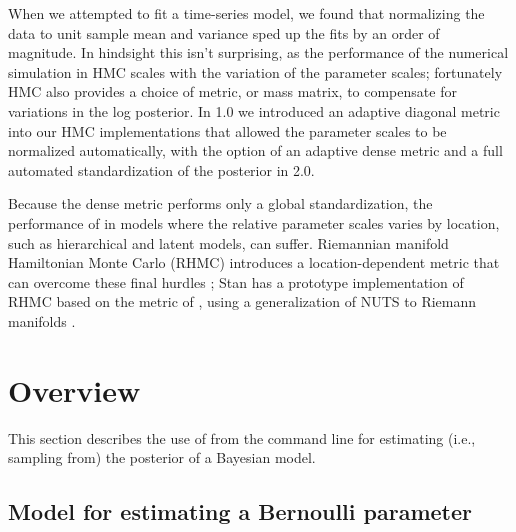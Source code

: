 \documentclass[article]{jss}
\begin{document}
When we attempted to fit a time-series model, we found that
normalizing the data to unit sample mean and variance sped up the fits
by an order of magnitude.  In hindsight this isn't surprising, as the
performance of the numerical simulation in HMC scales with the
variation of the parameter scales; fortunately HMC also provides a
choice of metric, or mass matrix, to compensate for variations in the
log posterior.  In  1.0 we introduced an adaptive
diagonal metric into our HMC implementations that allowed the
parameter scales to be normalized automatically, with the option of an
adaptive dense metric and a full automated standardization of the
posterior in  2.0.

Because the dense metric performs only a global standardization, the
performance of  in models where the relative parameter
scales varies by location, such as hierarchical and latent models, can
suffer.  Riemannian manifold Hamiltonian Monte Carlo (RHMC) introduces
a location-dependent metric that can overcome these final hurdles
\citep{GirolamiCalderhead:2011}; Stan has a prototype implementation
of RHMC based on the metric of \citep{Betancourt:2012}, using a
generalization of NUTS to Riemann manifolds \citep{Betancourt:2013}.

\section{Overview}

This section describes the use of  from the command
line for estimating (i.e., sampling from) the posterior of a Bayesian
model.

\subsection{Model for estimating a Bernoulli parameter}
\end{document}
